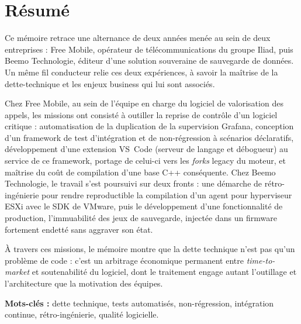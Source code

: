 \chapter*{Résumé}

Ce mémoire retrace une alternance de deux années menée au sein de deux
entreprises : Free Mobile, opérateur de télécommunications du groupe Iliad,
puis Beemo Technologie, éditeur d'une solution souveraine de sauvegarde de
données. Un même fil conducteur relie ces deux expériences, à savoir la
maîtrise de la \gls{dette-technique} et les enjeux business qui lui sont
associés.

Chez Free Mobile, au sein de l'équipe en charge du logiciel de valorisation
des appels, les missions ont consisté à outiller la reprise de contrôle d'un
logiciel critique : automatisation de la duplication de la supervision
Grafana, conception d'un framework de test d'intégration et de non-régression
à scénarios déclaratifs, développement d'une extension VS~Code (serveur de
langage et débogueur) au service de ce framework, portage de celui-ci vers
les \emph{forks} legacy du moteur, et maîtrise du coût de compilation d'une
base C++ conséquente. Chez Beemo Technologie, le travail s'est poursuivi sur
deux fronts : une démarche de rétro-ingénierie pour rendre reproductible la
compilation d'un agent pour hyperviseur ESXi avec le SDK de VMware, puis le développement
d'une fonctionnalité de production, l'immuabilité des jeux de sauvegarde,
injectée dans un firmware fortement endetté sans aggraver son état.

À travers ces missions, le mémoire montre que la dette technique n'est pas
qu'un problème de code : c'est un arbitrage économique permanent entre
\emph{time-to-market} et soutenabilité du logiciel, dont le traitement engage
autant l'outillage et l'architecture que la motivation des équipes.

\vspace{1em}
\noindent\textbf{Mots-clés :} dette technique, tests automatisés,
non-régression, intégration continue, rétro-ingénierie, qualité logicielle.

